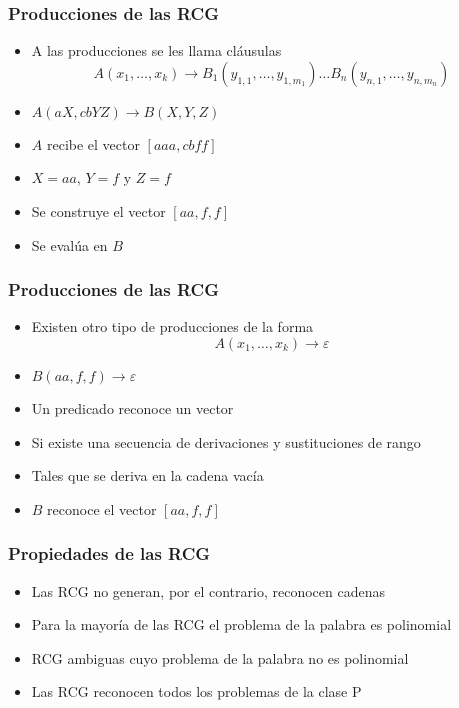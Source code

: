 \documentclass{beamer}
\begin{document}
\begin{frame}
    \frametitle{Producciones de las RCG}
    
    \begin{itemize}
        \item A las producciones se les llama cláusulas
              \[
                  A(x_1, \ldots, x_k) \to B_1(y_{1,1}, \ldots, y_{1,m_1}) \ldots B_n(y_{n,1}, \ldots, y_{n,m_n})
              \]
              \pause
        \item $A(aX,cbYZ)\to B(X,Y,Z)$
              \pause
        \item $A$ recibe el vector $[aaa,cbff]$
              \pause
        \item $X=aa$, $Y=f$ y $Z=f$
              \pause
        \item Se construye el vector $[aa,f,f]$
              \pause
        \item Se evalúa en $B$
    \end{itemize}
\end{frame}

\begin{frame}
    \frametitle{Producciones de las RCG}
    
    \begin{itemize}
        \item Existen otro tipo de producciones de la forma
              $$A(x_1, \ldots, x_k) \to \varepsilon$$
              \pause 
        \item $B(aa,f,f)\to \varepsilon$
              \pause 
        \item Un predicado reconoce un vector
              \pause     
        \item Si existe una secuencia de derivaciones y sustituciones de rango
              \pause         
        \item Tales que se deriva en la cadena vacía
              \pause
        \item $B$ reconoce el vector $[aa,f,f]$
    \end{itemize}
\end{frame}


\begin{frame}
    \frametitle{Propiedades de las RCG}
    
    \begin{itemize}
        \item Las RCG no generan, por el contrario, reconocen cadenas
              \pause
        \item Para la mayoría de las RCG el problema de la palabra es polinomial
              \pause
        \item RCG ambiguas cuyo problema de la palabra no es polinomial
              \pause
        \item Las RCG reconocen todos los problemas de la clase P
              
    \end{itemize}
\end{frame}
\end{document}
